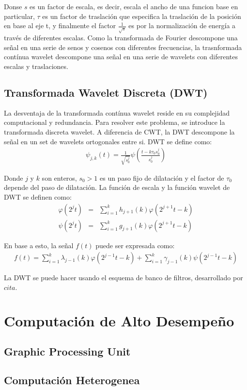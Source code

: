 Donse $s$ es un factor de escala, es decir, escala el ancho de una funcion base
en particular, $\tau$ es un factor de traslación que especifica la traslación
de la posición en base al eje t, y finalmente el factor $\frac{1}{\sqrt{s}}$ es
por la normalización de energía a través de diferentes escalas. Como la
transformada de Fourier descompone una señal en una serie de senos y cosenos
con diferentes frecuencias, la trasnformada contínua wavelet descompone una
señal en una serie de wavelets con diferentes escalas y traslaciones.

\subsection{Transformada Wavelet Discreta (DWT)}
La desventaja de la transformada contínua wavelet reside en su complejidad
computacional y redundancia. Para resolver este problema, se introduce la
transformada discreta wavelet. A diferencia de CWT, la DWT descompone la señal en un set de wavelets ortogonales entre si. DWT se define como:
\begin{eqnarray*}
	\psi_{j,k}(t) = \frac{1}{\sqrt{s^{j}_{0}}}\psi\left(\frac{t-k\tau_0s^{j}_{0}}{s^{j}_{0}}\right)
\end{eqnarray*}

Donde $j$ y $k$ son enteros, $s_0 > 1$ es un paso fijo de dilatación y el
factor de $\tau_0$ depende del paso de dilatación. La función de escala y la
función wavelet de DWT se definen como:
\begin{eqnarray*}
	\varphi(2^jt)	&=&	\sum^{k}_{i=1}h_{j+1}(k)\varphi(2^{j+1}t-k)\\
	\psi(2^jt)		&=&	\sum^{k}_{i=1}g_{j+1}(k)\varphi(2^{j+1}t-k)
\end{eqnarray*}

En base a esto, la señal $f(t)$ puede ser expresada como:
\begin{eqnarray*}
	f(t) = \sum^{k}_{i=1}\lambda_{j-1}(k)\varphi(2^{j-1}t-k) + \sum^{k}_{i=1}\gamma_{j-1}(k)\psi(2^{j-1}t-k)
\end{eqnarray*}

La DWT se puede hacer usando el esquema de banco de filtros, desarrollado por $cita$.
\section{Computación de Alto Desempeño}
\subsection{Graphic Processing Unit}
\subsection{Computación Heterogenea}
